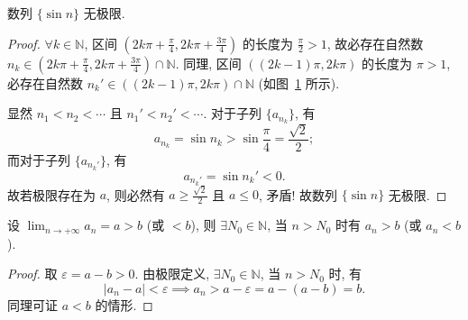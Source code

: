 \begin{example}\label{ex:1.1.13}
数列 $\{\sin n\}$ 无极限.
\end{example}
\begin{proof}
$\forall k\in\mathbb{N}$, 区间 $\left(2k\pi+\frac{\pi}{4}, 2k\pi+\frac{3\pi}{4}\right)$ 的长度为 $\frac{\pi}{2}>1$, 故必存在自然数 $n_{k}\in\left(2k\pi+\frac{\pi}{4}, 2k\pi+\frac{3\pi}{4}\right)\cap\mathbb{N}$. 同理, 区间 $((2k-1)\pi, 2k\pi)$ 的长度为 $\pi>1$, 必存在自然数 $n_{k}'\in((2k-1)\pi, 2k\pi)\cap\mathbb{N}$ (如图~\ref{fig:1.1.5} 所示).

\begin{figure}[htbp]
\centering
{}
\caption{}\label{fig:1.1.5}
\end{figure}

显然 $n_1<n_2<\cdots$ 且 $n_1'<n_2'<\cdots$. 对于子列 $\{a_{n_k}\}$, 有
\[
  a_{n_k} = \sin n_k > \sin\frac{\pi}{4} = \frac{\sqrt{2}}{2};
\]
而对于子列 $\{a_{n_k'}\}$, 有
\[
  a_{n_k'} = \sin n_k' < 0.
\]
故若极限存在为 $a$, 则必然有 $a\geqslant\frac{\sqrt{2}}{2}$ 且 $a\leqslant 0$, 矛盾! 故数列 $\{\sin n\}$ 无极限.
\end{proof}

\begin{theorem}[保号性与保序性]\label{thm:1.1.6}
设 $\lim_{n\to+\infty} a_n = a > b$ (或 $<b$), 则 $\exists N_0 \in \mathbb{N}$, 当 $n>N_0$ 时有 $a_n > b$ (或 $a_n < b$).
\end{theorem}
\begin{proof}
取 $\varepsilon = a-b > 0$. 由极限定义, $\exists N_0\in\mathbb{N}$, 当 $n>N_0$ 时, 有
\[
  |a_n-a| < \varepsilon \implies a_n > a-\varepsilon = a-(a-b) = b.
\]
同理可证 $a<b$ 的情形.
\end{proof}

